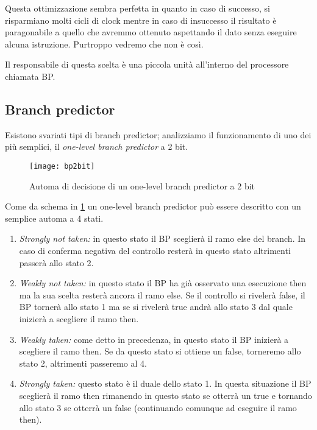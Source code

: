 		Questa ottimizzazione sembra perfetta in quanto in caso di successo, si risparmiano molti cicli di clock mentre in caso di insuccesso il risultato è paragonabile a quello che avremmo ottenuto aspettando il dato senza eseguire alcuna istruzione. Purtroppo vedremo che non è così.
		
		Il responsabile di questa scelta è una piccola unità all'interno del processore chiamata \ac{BP}.
		
		\subsection{Branch predictor}
			Esistono svariati tipi di branch predictor; analizziamo il funzionamento di uno dei più semplici, il \emph{one-level branch predictor} a 2 bit.
			
			\begin{figure}
				\begin{center}
					\texttt{[image: bp2bit]}
					\caption{Automa di decisione di un one-level branch predictor a 2 bit}
					\label{fig:bp2bits}
				\end{center}
			\end{figure}
		
			Come da schema in \cref{fig:bp2bits} un one-level branch predictor può essere descritto con un semplice automa a 4 stati.
			
			\begin{enumerate}
				\item \emph{Strongly not taken:} in questo stato il \ac{BP} sceglierà il ramo else del branch. In caso di conferma negativa del controllo resterà in questo stato altrimenti passerà allo stato 2.
				\item \emph{Weakly not taken:} in questo stato il \ac{BP} ha già osservato una esecuzione then ma la sua scelta resterà ancora il ramo else. Se il controllo si rivelerà false, il \ac{BP} tornerà allo stato 1 ma se si rivelerà true andrà allo stato 3 dal quale inizierà a scegliere il ramo then.
				\item \emph{Weakly taken:} come detto in precedenza, in questo stato il \ac{BP} inizierà a scegliere il ramo then. Se da questo stato si ottiene un false, torneremo allo stato 2, altrimenti passeremo al 4.
				\item \emph{Strongly taken:} questo stato è il duale dello stato 1. In questa situazione il \ac{BP} sceglierà il ramo then rimanendo in questo stato se otterrà un true e tornando allo stato 3 se otterrà un false (continuando comunque ad eseguire il ramo then).
			\end{enumerate}
		
